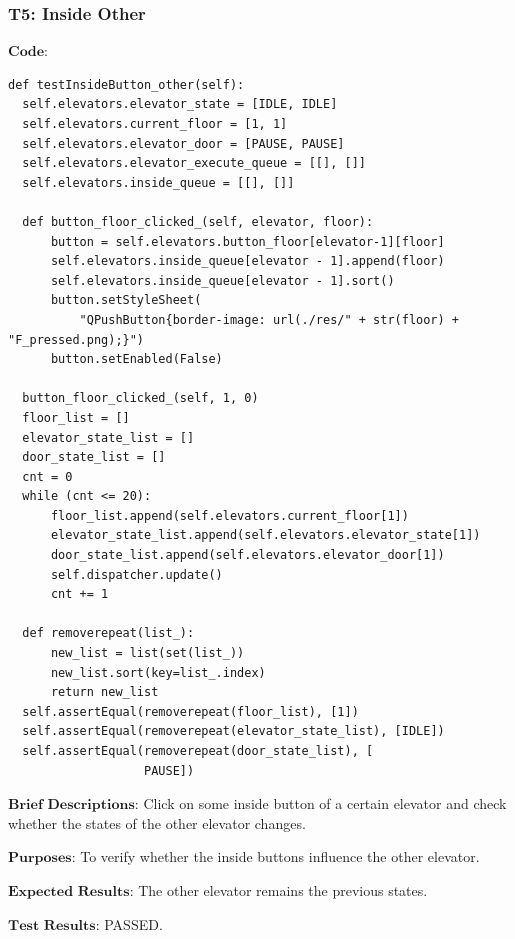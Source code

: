 \documentclass{article}
\begin{document}
\subsubsection*{T5: Inside Other}
$\textbf{Code:}$
\begin{lstlisting}
def testInsideButton_other(self):
  self.elevators.elevator_state = [IDLE, IDLE]
  self.elevators.current_floor = [1, 1]
  self.elevators.elevator_door = [PAUSE, PAUSE]
  self.elevators.elevator_execute_queue = [[], []]
  self.elevators.inside_queue = [[], []]

  def button_floor_clicked_(self, elevator, floor):
      button = self.elevators.button_floor[elevator-1][floor]
      self.elevators.inside_queue[elevator - 1].append(floor)
      self.elevators.inside_queue[elevator - 1].sort()
      button.setStyleSheet(
          "QPushButton{border-image: url(./res/" + str(floor) + "F_pressed.png);}")
      button.setEnabled(False)

  button_floor_clicked_(self, 1, 0)
  floor_list = []
  elevator_state_list = []
  door_state_list = []
  cnt = 0
  while (cnt <= 20):
      floor_list.append(self.elevators.current_floor[1])
      elevator_state_list.append(self.elevators.elevator_state[1])
      door_state_list.append(self.elevators.elevator_door[1])
      self.dispatcher.update()
      cnt += 1

  def removerepeat(list_):
      new_list = list(set(list_))
      new_list.sort(key=list_.index)
      return new_list
  self.assertEqual(removerepeat(floor_list), [1])
  self.assertEqual(removerepeat(elevator_state_list), [IDLE])
  self.assertEqual(removerepeat(door_state_list), [
                   PAUSE])
\end{lstlisting}

$\textbf{Brief Descriptions:}$
Click on some inside button of a certain elevator and check whether the states of the other elevator changes.

$\textbf{Purposes:}$
To verify whether the inside buttons influence the other elevator.

$\textbf{Expected Results:}$
The other elevator remains the previous states.

$\textbf{Test Results:}$
PASSED.
\end{document}
